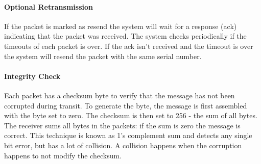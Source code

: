 \documentclass[12pt]{article}
\begin{document}
\paragraph{Optional Retransmission}
If the packet is marked as resend the system will wait for a response (ack) indicating that the packet was received. The system checks periodically if the timeouts of each packet is over. If the ack isn't received and the timeout is over the system will resend the packet with the same serial number.

\paragraph{Integrity Check}
Each packet has a checksum byte to verify that the message has not been corrupted during transit. To generate the byte, the message is first assembled with the byte set to zero. The checksum is then set to 256 - the sum of all bytes. The receiver sums all bytes in the packets: if the sum is zero the message is correct. This technique is known as 1's complement sum \cite{checksum} and detects any single bit error, but has a lot of collision. A collision happens when the corruption happens to not modify the checksum.

\clearpage
\end{document}
